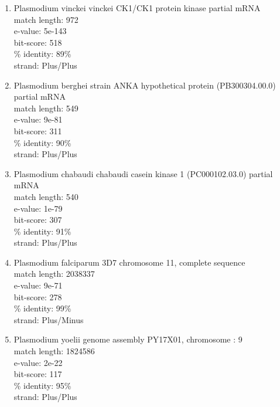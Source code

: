 \documentclass{acm_proc_article-sp}
\begin{document}
\begin{enumerate}
 \item Plasmodium vinckei vinckei CK1/CK1 protein kinase partial mRNA \\
  match length: 972 \\
 e-value: 5e-143 \\
 bit-score: 518 \\
 \% identity: 89\%\\
 strand: Plus/Plus \\
 
 \item Plasmodium berghei strain ANKA hypothetical protein (PB300304.00.0) partial mRNA \\ 
  match length: 549 \\
 e-value: 9e-81 \\
 bit-score: 311 \\
 \% identity: 90\% \\
 strand: Plus/Plus \\
 
 \item Plasmodium chabaudi chabaudi casein kinase 1 (PC000102.03.0) partial mRNA \\
  match length: 540 \\
 e-value: 1e-79 \\
 bit-score: 307 \\
 \% identity: 91\% \\
 strand: Plus/Plus \\
 
 \item Plasmodium falciparum 3D7 chromosome 11, complete sequence \\
  match length: 2038337 \\
 e-value: 9e-71 \\
 bit-score: 278 \\
 \% identity: 99\% \\
 strand: Plus/Minus \\
 
 \item Plasmodium yoelii genome assembly PY17X01, chromosome : 9 \\
  match length: 1824586 \\
 e-value: 2e-22 \\
 bit-score: 117 \\
 \% identity: 95\% \\
 strand: Plus/Plus \\
 
\end{enumerate}
\end{document}
